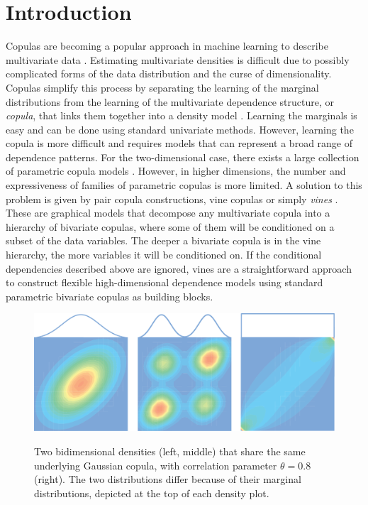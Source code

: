 \documentclass{article}
\begin{document}
\section{Introduction}
Copulas are becoming a popular approach in machine learning to describe
multivariate data \cite{Elidan2012,Kirshner2007,Elidan2010,Wilson2010}.
Estimating multivariate densities is difficult due to possibly complicated forms
of the data distribution and the curse of dimensionality. Copulas simplify this
process by separating the learning of the marginal distributions from the
learning of the multivariate dependence structure, or \emph{copula}, that links
them together into a density model \cite{Joe2005}. Learning the
marginals is easy and can be done using standard univariate methods. However,
learning the copula is more difficult and requires models that can represent a
broad range of dependence patterns. For the two-dimensional case, there exists
a large collection of parametric copula models \cite{Nelsen2006}. However, in
higher dimensions, the number and expressiveness of families of parametric
copulas is more limited. A solution to this problem is given by pair copula
constructions, vine copulas or simply \emph{vines}
\cite{Bedford2002,Kurowicka2006}.  These are graphical models that decompose any
multivariate copula into a hierarchy of bivariate copulas, where some of them
will be conditioned on a subset of the data variables.  The deeper a bivariate
copula is in the vine hierarchy, the more variables it will be conditioned on.
If the conditional dependencies described above are ignored, vines are a
straightforward approach to construct flexible high-dimensional dependence
models using standard parametric bivariate copulas as building blocks.

\begin{figure}
  \begin{center}
    \includegraphics[width=\linewidth]{figures/copulas.pdf}
    \label{fig:models}
    \caption{Two bidimensional densities (left, middle) that share the same
    underlying Gaussian copula, with correlation parameter $\theta = 0.8$
    (right).  The two distributions differ because of their
    marginal distributions, depicted at the top of each density plot.}
  \end{center}
\end{figure}
\end{document}
